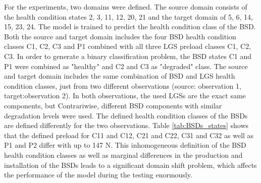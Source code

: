 For the experiments, two domains were defined. The source domain consists of the health condition states 2, 3, 11, 12, 20, 21 and the target domain of 5, 6, 14, 15, 23, 24. The model is trained to predict the health condition class of the BSD. Both the source and target domain includes the four BSD health condition classes C1, C2, C3 and P1 combined with all three LGS preload classes C1, C2, C3. In order to generate a binary classification problem, the BSD states C1 and P1 were combined as "healthy" and C2 and C3 as "degraded" class. The source and target domain includes the same combination of BSD and LGS health condition classes, just from two different observations (source: observation 1, target:observation 2). In both observations, the used LGSs are the exact same components, but Contrariwise, different BSD components with similar degradation levels were used. The defined health condition classes of the BSDs are defined differently for the two observations. Table \ref {tab:BSDs_states} shows that the defined preload for C11 and C12, C21 and C22, C31 and C32 as well as P1 and P2 differ with up to 147 N. This inhomogeneous definition of the BSD health condition classes as well as marginal differences in the production and installation of the BSDs leads to a significant domain shift problem, which affects the performance of the model during the testing enormously. 


